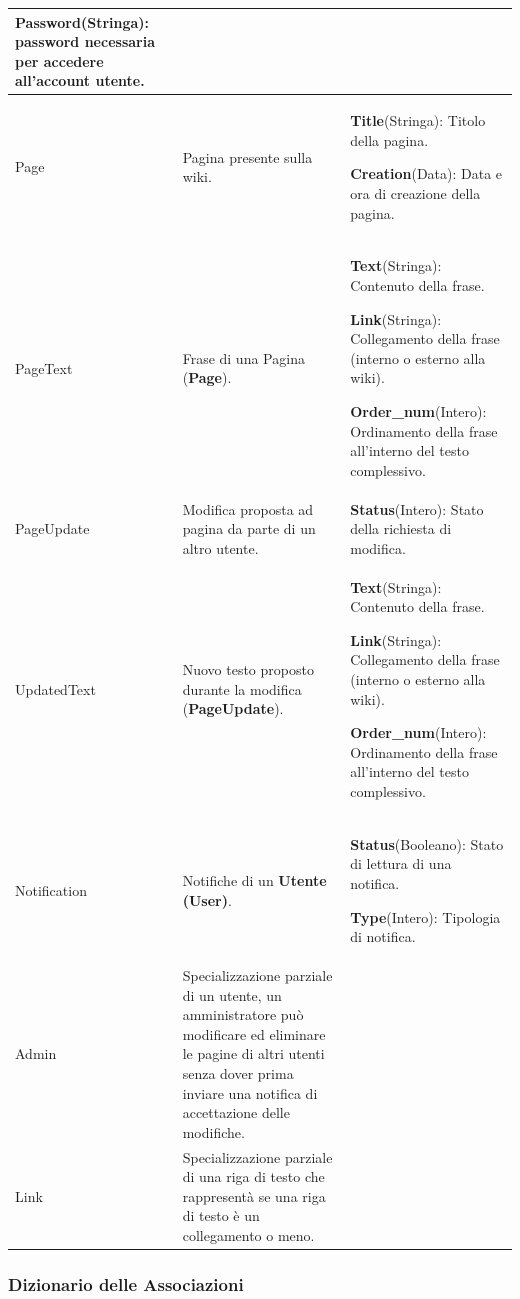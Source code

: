 \documentclass{article}
\begin{document}
{\begin{table}[H]
\begin{tabularx}{\textwidth}{|l|X|X|}
			\textbf{Password}(Stringa): password necessaria
			per accedere all’account utente. \\
			\hline
			Page & Pagina presente sulla wiki. & 
			\textbf{Title}(Stringa): Titolo della pagina.
			
			\textbf{Creation}(Data): Data e ora di creazione della pagina.
			\\
			\hline
		    PageText & Frase di una Pagina (\textbf{Page}). &
			\textbf{Text}(Stringa): Contenuto della frase.
			
			\textbf{Link}(Stringa): Collegamento della frase (interno o esterno alla wiki).
			
			\textbf{Order\_num}(Intero): Ordinamento della frase all'interno del testo complessivo.
			\\
			\hline
			PageUpdate & Modifica proposta ad pagina da parte di un altro utente. & 
			\textbf{Status}(Intero): Stato della richiesta di modifica.
			\\
			\hline
			UpdatedText & Nuovo testo proposto durante la modifica (\textbf{PageUpdate}). & 
			\textbf{Text}(Stringa): Contenuto della frase.

			\textbf{Link}(Stringa): Collegamento della frase (interno o esterno alla wiki).

			\textbf{Order\_num}(Intero): Ordinamento della frase all'interno del testo complessivo.
			\\
			\hline
			Notification & Notifiche di un \textbf{Utente (User)}.& 
		    \textbf{Status}(Booleano): Stato di lettura di una notifica.
		    
		    \textbf{Type}(Intero): Tipologia di notifica.
			\\
			\hline
			Admin & Specializzazione parziale di un utente, un amministratore pu\`o modificare ed eliminare le pagine di altri utenti senza dover prima inviare una notifica di accettazione delle modifiche.& 
			\\
			\hline
			Link & Specializzazione parziale di una riga di testo che rappresent\`a se una riga di testo \`e un collegamento o meno.& 
			\\
			\hline

		\end{tabularx}
		
	\end{table}
	
	{\subsubsection{Dizionario delle Associazioni}}
	
}
\end{document}
